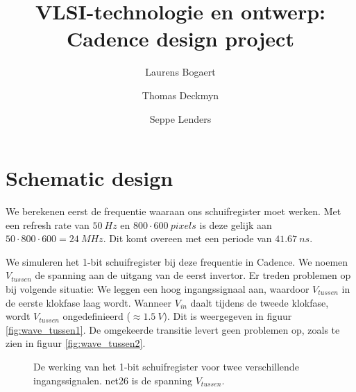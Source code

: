 \documentclass[11pt,a4paper,oneside,dutch]{article}
\author{Laurens Bogaert \and Thomas Deckmyn \and Seppe Lenders}
\title{VLSI-technologie en ontwerp: Cadence design project}
\date{\vspace{-5ex}} %
\begin{document}
\maketitle{}

\section{Schematic design}

We berekenen eerst de frequentie waaraan ons schuifregister moet werken. Met een refresh rate van $\SI{50}{Hz}$ en $800 \cdot \SI{600}{pixels}$ is deze gelijk aan $50 \cdot 800 \cdot 600 = \SI{24}{MHz}$. Dit komt overeen met een periode van $\SI{41,67}{ns}$.

We simuleren het 1-bit schuifregister bij deze frequentie in Cadence. We noemen $V_{tussen}$ de spanning aan de uitgang van de eerst invertor. Er treden problemen op bij volgende situatie: We leggen een hoog ingangssignaal aan, waardoor $V_{tussen}$ in de eerste klokfase laag wordt. Wanneer $V_{in}$ daalt tijdens de tweede klokfase, wordt $V_{tussen}$ ongedefinieerd ($\approx \SI{1,5}{V}$). Dit is weergegeven in figuur \ref{fig:wave_tussen1}. De omgekeerde transitie levert geen problemen op, zoals te zien in figuur \ref{fig:wave_tussen2}.

\begin{figure}[htp]
	\centering
	\caption{De werking van het 1-bit schuifregister voor twee verschillende ingangssignalen. net26 is de spanning $V_{tussen}$.}
	\label{fig:wave_tussen}
\end{figure}
\end{document}
